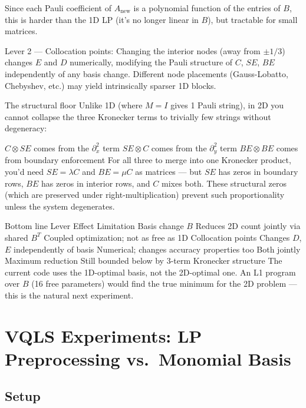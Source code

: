 \documentclass{article}
\begin{document}
Since each Pauli coefficient of $A_\text{new}$ is a polynomial function of the entries of $B$, this is harder than the 1D LP (it's no longer linear in $B$), but tractable for small matrices.

Lever 2 — Collocation points: Changing the interior nodes (away from $\pm 1/3$) changes $E$ and $D$ numerically, modifying the Pauli structure of $C$, $SE$, $BE$ independently of any basis change. Different node placements (Gauss-Lobatto, Chebyshev, etc.) may yield intrinsically sparser 1D blocks.

The structural floor
Unlike 1D (where $M = I$ gives 1 Pauli string), in 2D you cannot collapse the three Kronecker terms to trivially few strings without degeneracy:

$C \otimes SE$ comes from the $\partial^2_x$ term
$SE \otimes C$ comes from the $\partial^2_y$ term
$BE \otimes BE$ comes from boundary enforcement
For all three to merge into one Kronecker product, you'd need $SE = \lambda C$ and $BE = \mu C$ as matrices — but $SE$ has zeros in boundary rows, $BE$ has zeros in interior rows, and $C$ mixes both. These structural zeros (which are preserved under right-multiplication) prevent such proportionality unless the system degenerates.

Bottom line
Lever	Effect	Limitation
Basis change $B$	Reduces 2D count jointly via shared $B^T$	Coupled optimization; not as free as 1D
Collocation points	Changes $D$, $E$ independently of basis	Numerical; changes accuracy properties too
Both jointly	Maximum reduction	Still bounded below by 3-term Kronecker structure
The current code uses the 1D-optimal basis, not the 2D-optimal one. An L1 program over $B$ (16 free parameters) would find the true minimum for the 2D problem — this is the natural next experiment.


\noindent\makebox[\linewidth]{\rule{\paperwidth}{0.4pt}}



\noindent\makebox[\linewidth]{\rule{\paperwidth}{0.4pt}}

\section*{VQLS Experiments: LP Preprocessing vs.\ Monomial Basis}

\subsection*{Setup}
\end{document}
